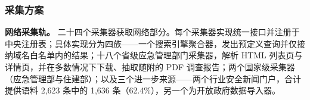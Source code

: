 \documentclass[11pt]{article}
\begin{document}
\subsubsection{{\cjkfont 采\allowbreak 集\allowbreak 方\allowbreak 案}}
\textbf{{\cjkfont 网\allowbreak 络\allowbreak 采\allowbreak 集\allowbreak 轨\allowbreak 。}} {\cjkfont 二\allowbreak 十\allowbreak 四\allowbreak 个\allowbreak 采\allowbreak 集\allowbreak 器\allowbreak 获\allowbreak 取\allowbreak 网\allowbreak 络\allowbreak 部\allowbreak 分\allowbreak 。\allowbreak 每\allowbreak 个\allowbreak 采\allowbreak 集\allowbreak 器\allowbreak 实\allowbreak 现\allowbreak 统\allowbreak 一\allowbreak 接\allowbreak 口\allowbreak 并\allowbreak 注\allowbreak 册\allowbreak 于\allowbreak 中\allowbreak 央\allowbreak 注\allowbreak 册\allowbreak 表\allowbreak ；\allowbreak 具\allowbreak 体\allowbreak 实\allowbreak 现\allowbreak 分\allowbreak 为\allowbreak 四\allowbreak 族}------{\cjkfont 一\allowbreak 个\allowbreak 搜\allowbreak 索\allowbreak 引\allowbreak 擎\allowbreak 聚\allowbreak 合\allowbreak 器\allowbreak ，\allowbreak 发\allowbreak 出\allowbreak 预\allowbreak 定\allowbreak 义\allowbreak 查\allowbreak 询\allowbreak 并\allowbreak 仅\allowbreak 接\allowbreak 纳\allowbreak 域\allowbreak 名\allowbreak 白\allowbreak 名\allowbreak 单\allowbreak 内\allowbreak 的\allowbreak 结\allowbreak 果\allowbreak ；\allowbreak 十\allowbreak 八\allowbreak 个\allowbreak 省\allowbreak 级\allowbreak 应\allowbreak 急\allowbreak 管\allowbreak 理\allowbreak 部\allowbreak 门\allowbreak 采\allowbreak 集\allowbreak 器\allowbreak ，\allowbreak 解\allowbreak 析} HTML {\cjkfont 列\allowbreak 表\allowbreak 页\allowbreak 与\allowbreak 详\allowbreak 情\allowbreak 页\allowbreak ，\allowbreak 并\allowbreak 在\allowbreak 多\allowbreak 数\allowbreak 情\allowbreak 况\allowbreak 下\allowbreak 下\allowbreak 载\allowbreak 、\allowbreak 抽\allowbreak 取\allowbreak 随\allowbreak 附\allowbreak 的} PDF {\cjkfont 调\allowbreak 查\allowbreak 报\allowbreak 告\allowbreak ；\allowbreak 两\allowbreak 个\allowbreak 国\allowbreak 家\allowbreak 级\allowbreak 采\allowbreak 集\allowbreak 器\allowbreak （\allowbreak 应\allowbreak 急\allowbreak 管\allowbreak 理\allowbreak 部\allowbreak 与\allowbreak 住\allowbreak 建\allowbreak 部\allowbreak ）\allowbreak ；\allowbreak 以\allowbreak 及\allowbreak 三\allowbreak 个\allowbreak 进\allowbreak 一\allowbreak 步\allowbreak 来\allowbreak 源}------{\cjkfont 两\allowbreak 个\allowbreak 行\allowbreak 业\allowbreak 安\allowbreak 全\allowbreak 新\allowbreak 闻\allowbreak 门\allowbreak 户\allowbreak ，\allowbreak 合\allowbreak 计\allowbreak 提\allowbreak 供\allowbreak 语\allowbreak 料} 2,623 {\cjkfont 条\allowbreak 中\allowbreak 的} 1,636 {\cjkfont 条\allowbreak （}62.4\%{\cjkfont ）\allowbreak ，\allowbreak 另\allowbreak 一\allowbreak 个\allowbreak 为\allowbreak 开\allowbreak 放\allowbreak 政\allowbreak 府\allowbreak 数\allowbreak 据\allowbreak 导\allowbreak 入\allowbreak 器\allowbreak 。}
\end{document}
